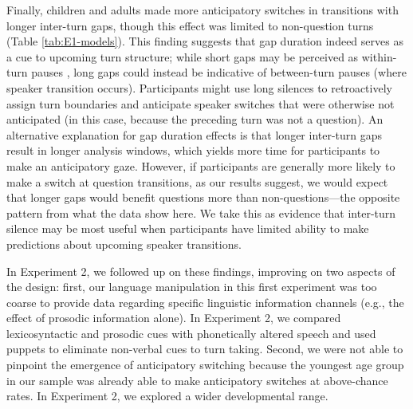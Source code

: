 \documentclass[authoryear, 12pt]{elsarticle}
\begin{document}
Finally, children and adults made more anticipatory switches in transitions with longer inter-turn gaps, though this effect was limited to non-question turns (Table \ref{tab:E1-models}). This finding suggests that gap duration indeed serves as a cue to upcoming turn structure; while short gaps may be perceived as within-turn pauses \citep{mannel2009}, long gaps could instead be indicative of between-turn pauses (where speaker transition occurs). Participants might use long silences to retroactively assign turn boundaries and anticipate speaker switches that were otherwise not anticipated (in this case, because the preceding turn was not a question). An alternative explanation for gap duration effects is that longer inter-turn gaps result in longer analysis windows, which yields more time for participants to make an anticipatory gaze. However, if participants are generally more likely to make a switch at question transitions, as our results suggest, we would expect that longer gaps would benefit questions more than non-questions---the opposite pattern from what the data show here. We take this as evidence that inter-turn silence may be most useful when participants have limited ability to make predictions about upcoming speaker transitions.

In Experiment 2, we followed up on these findings, improving on two aspects of the design: first, our language manipulation in this first experiment was too coarse to provide data regarding specific linguistic information channels (e.g., the effect of prosodic information alone). In Experiment 2, we compared lexicosyntactic and prosodic cues with phonetically altered speech and used puppets to eliminate non-verbal cues to turn taking. Second, we were not able to pinpoint the emergence of anticipatory switching because the youngest age group in our sample was already able to make anticipatory switches at above-chance rates. In Experiment 2, we explored a wider developmental range.

\end{document}
